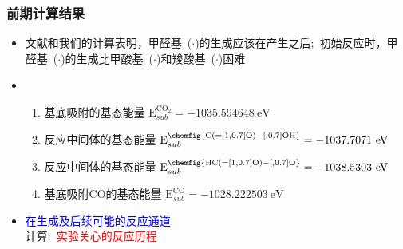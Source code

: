 \small
\begin{frame}[allowframebreaks]
	\frametitle{前期计算结果}
	\begin{itemize}
		\item 文献和我们的计算表明，甲醛基~\textrm{($\cdot$)}的生成应该在\textrm{}产生之后;~初始反应时，甲醛基~\textrm{($\cdot$)}的生成比甲酸基~\textrm{($\cdot$)}和羧酸基~\textrm{($\cdot$)}困难
		\item 
			\begin{enumerate}
				\item 基底吸附\textrm{}的基态能量 $\mathrm{E}_{sub}^{\mathrm{CO_2}}=-1035.594648~\mathrm{eV}$
				\item 反应中间体的基态能量 $\mathrm{E}_{sub}^{\mathrm{\chemfig{C(=[1,0.7]O)-[,0.7]OH}}}=-1037.7071~\mathrm{eV}$
				\item 反应中间体的基态能量 $\mathrm{E}_{sub}^{\mathrm{\chemfig{HC(=[1,0.7]O)-[,0.7]O}}}=-1038.5303~\mathrm{eV}$
				\item 基底吸附\textrm{CO}的基态能量 $\mathrm{E}_{sub}^{\mathrm{CO}}=-1028.222503~\mathrm{eV}$
			\end{enumerate}
		\item \textcolor{blue}{在\textrm{}生成及后续可能的反应通道}\\
	计算:~\textcolor{red}{实验关心的反应历程}
	\end{itemize}
\end{frame}

